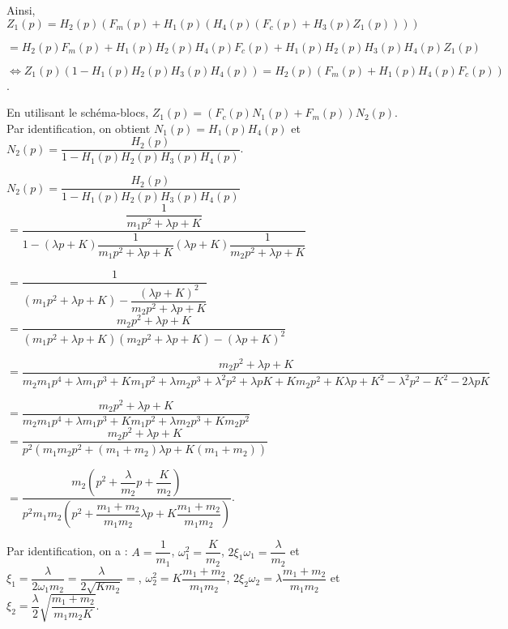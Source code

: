 \begin{multicols}{2}
\begin{corrige}
Ainsi, $Z_1(p)=H_2(p)\left(F_m(p)+H_1(p)\left( H_4(p)\left(F_c(p)+H_3(p)Z_1(p)\right)\right)\right) $

$=H_2(p)F_m(p)+H_1(p)H_2(p) H_4(p)F_c(p)+H_1(p)H_2(p) H_3(p)H_4(p)Z_1(p) $

$\Leftrightarrow Z_1(p)\left( 1-H_1(p)H_2(p) H_3(p)H_4(p)\right)=H_2(p)\left(F_m(p)+H_1(p)H_4(p)F_c(p)\right) $. 

En utilisant le schéma-blocs, $Z_1(p)=\left(F_c(p)N_1(p)+F_m(p)\right)N_2(p)$. 
Par identification, on obtient $N_1(p)=H_1(p)H_4(p)$ et $N_2(p)=\dfrac{H_2(p)}{1-H_1(p)H_2(p) H_3(p)H_4(p)}$.

\end{corrige}
\else
\fi

\ifprof
\begin{corrige}
$N_2(p)=\dfrac{H_2(p)}{1-H_1(p)H_2(p) H_3(p)H_4(p)}$ 
$= \dfrac{\dfrac{1}{m_1p^2  + \lambda p+K}}{1-\left(\lambda p+K\right)\dfrac{1}{m_1p^2  + \lambda p+K} \left(\lambda p+K\right)\dfrac{1}{m_2p^2  + \lambda p+K}}$

$= \dfrac{1}{\left(m_1p^2  + \lambda p+K\right)- \dfrac{\left(\lambda p+K\right)^2}{m_2p^2  + \lambda p+K}}$
$= \dfrac{m_2p^2  + \lambda p+K}{\left(m_1p^2  + \lambda p+K\right)\left(m_2p^2  + \lambda p+K\right)- \left(\lambda p+K\right)^2}$

$= \dfrac{m_2p^2  + \lambda p+K}{
m_2m_1p^4  + \lambda m_1p^3+Km_1p^2+\lambda m_2p^3  + \lambda^2 p^2 +\lambda pK+Km_2p^2  + K\lambda p+K^2 - \lambda^2 p^2 -K^2 - 2\lambda p K}$

$= \dfrac{m_2p^2  + \lambda p+K}{
m_2m_1p^4  + \lambda m_1p^3+Km_1p^2+\lambda m_2p^3   +Km_2p^2 }$
$= \dfrac{m_2p^2  + \lambda p+K}{
p^2\left( m_1m_2p^2  + \left(m_1+ m_2\right) \lambda p  +K\left(m_1+m_2\right)\right) }$

$= \dfrac{m_2\left(p^2  + \dfrac{\lambda}{m_2}p+\dfrac{K}{m_2}\right)}{
p^2 m_1m_2 \left(p^2  + \dfrac{m_1+ m_2}{m_1m_2} \lambda p  +K\dfrac{m_1+m_2}{m_1m_2}\right) }$.

Par identification, on a : $A=\dfrac{1}{m_1}$, $\omega_1^2=\dfrac{K}{m_2}$, $2\xi_1\omega_1=\dfrac{\lambda}{m_2}$ et $\xi_1 = \dfrac{\lambda}{2 \omega_1 m_2}=\dfrac{\lambda}{2 \sqrt{Km_2}  } = $, $\omega_2^2=K\dfrac{m_1+m_2}{m_1m_2}$, $2\xi_2\omega_2=\lambda\dfrac{m_1+ m_2}{m_1m_2}$ et $\xi_2 = \dfrac{\lambda}{2}\sqrt{\dfrac{m_1+m_2}{m_1m_2 K}}$. 


\end{corrige}
\end{multicols}
